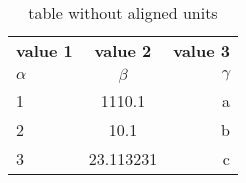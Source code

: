 \documentclass{article}
\begin{document}
	
\begin{table}[h!]
	\begin{center}
		\caption{table without aligned units}
		\label{tab:table1}
		\begin{tabular}{l|c|r}
			\textbf{value 1} & \textbf{value 2} & \textbf{value 3}\\
			$\alpha$ & $\beta$ & $\gamma$ \\
			\hline
			1 & 1110.1 & a\\
			2 & 10.1 & b\\
			3 & 23.113231 & c\\
			\end{tabular}
	\end{center}
\end{table}
\end{document}
